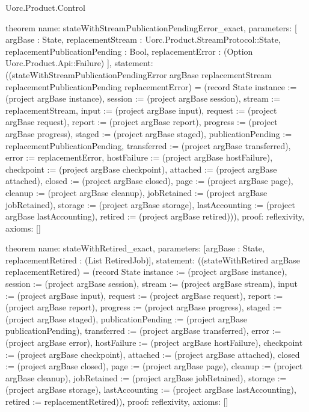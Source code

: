 \begin{lexlean}{Uorc.Product.Control}
\begin{semanticmodule}
theorem{
  name: stateWithStreamPublicationPendingError_exact,
  parameters: [
    argBase : State,
    replacementStream : Uorc.Product.StreamProtocol::State,
    replacementPublicationPending : Bool,
    replacementError : (Option Uorc.Product.Api::Failure)
  ],
  statement: ((stateWithStreamPublicationPendingError argBase replacementStream replacementPublicationPending replacementError) = (record State {instance := (project argBase instance), session := (project argBase session), stream := replacementStream, input := (project argBase input), request := (project argBase request), report := (project argBase report), progress := (project argBase progress), staged := (project argBase staged), publicationPending := replacementPublicationPending, transferred := (project argBase transferred), error := replacementError, hostFailure := (project argBase hostFailure), checkpoint := (project argBase checkpoint), attached := (project argBase attached), closed := (project argBase closed), page := (project argBase page), cleanup := (project argBase cleanup), jobRetained := (project argBase jobRetained), storage := (project argBase storage), lastAccounting := (project argBase lastAccounting), retired := (project argBase retired)})),
  proof: reflexivity{},
  axioms: []
}

theorem{
  name: stateWithRetired_exact,
  parameters: [argBase : State, replacementRetired : (List RetiredJob)],
  statement: ((stateWithRetired argBase replacementRetired) = (record State {instance := (project argBase instance), session := (project argBase session), stream := (project argBase stream), input := (project argBase input), request := (project argBase request), report := (project argBase report), progress := (project argBase progress), staged := (project argBase staged), publicationPending := (project argBase publicationPending), transferred := (project argBase transferred), error := (project argBase error), hostFailure := (project argBase hostFailure), checkpoint := (project argBase checkpoint), attached := (project argBase attached), closed := (project argBase closed), page := (project argBase page), cleanup := (project argBase cleanup), jobRetained := (project argBase jobRetained), storage := (project argBase storage), lastAccounting := (project argBase lastAccounting), retired := replacementRetired})),
  proof: reflexivity{},
  axioms: []
}


\end{semanticmodule}
\end{lexlean}
